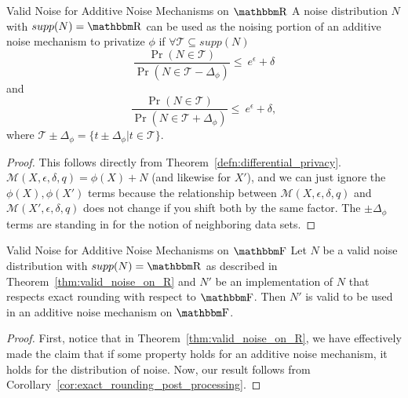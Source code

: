 \documentclass[11pt]{scrartcl} %
\begin{document}
\begin{theorem}
	\label{thm:valid_noise_on_R}
	Valid Noise for Additive Noise Mechanisms on $\R$ \newline
	A noise distribution $N$ with $supp(N) = \R$ can be used as the noising portion of an additive noise mechanism to privatize $\phi$ if
	$\forall \mathcal{T} \subseteq supp(N)$
	\[ \frac{\Pr(N \in \mathcal{T})}{\Pr(N \in \mathcal{T} - \Delta_{\phi})} \leq \ e^{\epsilon} + \delta \]
	and
	\[ \frac{\Pr(N \in \mathcal{T})}{\Pr(N \in \mathcal{T} + \Delta_{\phi})} \leq \ e^{\epsilon} + \delta, \]
	where $\mathcal{T} \pm \Delta_{\phi} = \{t \pm \Delta_{\phi} | t \in \mathcal{T}\}$.

	\begin{proof}
		This follows directly from Theorem~\ref{defn:differential_privacy}.
		$\mathcal{M}(X, \epsilon, \delta, q) = \phi(X) + N$ (and likewise for $X'$),
		and we can just ignore the $\phi(X), \phi(X')$ terms because the relationship between
		$\mathcal{M}(X, \epsilon, \delta, q)$ and $\mathcal{M}(X', \epsilon, \delta, q)$
		does not change if you shift both by the same factor.
		The $\pm \Delta_{\phi}$ terms are standing in for the notion of neighboring data sets.
	\end{proof}
\end{theorem}

\begin{corollary}
	\label{cor:valid_noise_on_F}
	Valid Noise for Additive Noise Mechanisms on $\F$ \newline
	Let $N$ be a valid noise distribution with $supp(N) = \R$ as described in Theorem~\ref{thm:valid_noise_on_R}
	and $N'$ be an implementation of $N$ that respects exact rounding with respect to $\F$.
	Then $N'$ is valid to be used in an additive noise mechanism on $\F$.

	\begin{proof}
		First, notice that in Theorem~\ref{thm:valid_noise_on_R}, we have
		effectively made the claim that if some property holds for an additive noise mechanism,
		it holds for the distribution of noise.
		Now, our result follows from Corollary~\ref{cor:exact_rounding_post_processing}.
	\end{proof}
\end{corollary}
\end{document}
